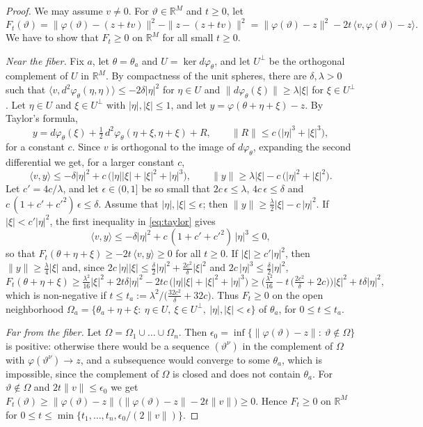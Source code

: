 \documentclass[11pt]{article}
\theoremstyle{definition}
\theoremstyle{remark}
\newcommand{\R}{\mathbb{R}}
\begin{document}
\begin{proof}
We may assume $v\ne0$. For $\vartheta\in\R^M$ and $t\ge0$, let
\[
F_t(\vartheta)=\|\varphi(\vartheta)-(z+tv)\|^2-\|z-(z+tv)\|^2=\|\varphi(\vartheta)-z\|^2-2t\,\langle v,\varphi(\vartheta)-z\rangle.
\]
We have to show that $F_t\ge0$ on $\R^M$ for all small $t\ge0$.

\emph{Near the fiber.} Fix $a$, let $\theta=\theta_a$ and $U=\ker d\varphi_\theta$, and let $U^\perp$ be the orthogonal complement of $U$ in $\R^M$. By compactness of the unit spheres, there are $\delta,\lambda>0$ such that $\langle v,d^2\varphi_\theta(\eta,\eta)\rangle\le-2\delta|\eta|^2$ for $\eta\in U$ and $\|d\varphi_\theta(\xi)\|\ge\lambda|\xi|$ for $\xi\in U^\perp$. Let $\eta\in U$ and $\xi\in U^\perp$ with $|\eta|,|\xi|\le1$, and let $y=\varphi(\theta+\eta+\xi)-z$. By Taylor's formula,
\[
y=d\varphi_\theta(\xi)+\tfrac12\,d^2\varphi_\theta(\eta+\xi,\eta+\xi)+R,\qquad\|R\|\le c\,\big(|\eta|^3+|\xi|^3\big),
\]
for a constant $c$. Since $v$ is orthogonal to the image of $d\varphi_\theta$, expanding the second differential we get, for a larger constant $c$,
\begin{equation}\label{eq:taylor}
\langle v,y\rangle\le-\delta|\eta|^2+c\,\big(|\eta||\xi|+|\xi|^2+|\eta|^3\big),\qquad\|y\|\ge\lambda|\xi|-c\,\big(|\eta|^2+|\xi|^2\big).
\end{equation}
Let $c'=4c/\lambda$, and let $\epsilon\in(0,1]$ be so small that $2c\,\epsilon\le\lambda$, $4c\,\epsilon\le\delta$ and $c\,(1+c'+c'^2)\,\epsilon\le\delta$. Assume that $|\eta|,|\xi|\le\epsilon$; then $\|y\|\ge\frac\lambda2|\xi|-c\,|\eta|^2$. If $|\xi|<c'|\eta|^2$, the first inequality in \eqref{eq:taylor} gives
\[
\langle v,y\rangle\le-\delta|\eta|^2+c\,(1+c'+c'^2)\,|\eta|^3\le0,
\]
so that $F_t(\theta+\eta+\xi)\ge-2t\,\langle v,y\rangle\ge0$ for all $t\ge0$. If $|\xi|\ge c'|\eta|^2$, then $\|y\|\ge\frac\lambda4|\xi|$ and, since $2c\,|\eta||\xi|\le\frac\delta2|\eta|^2+\frac{2c^2}\delta|\xi|^2$ and $2c\,|\eta|^3\le\frac\delta2|\eta|^2$,
\[
F_t(\theta+\eta+\xi)\ge\tfrac{\lambda^2}{16}|\xi|^2+2t\delta|\eta|^2-2tc\,\big(|\eta||\xi|+|\xi|^2+|\eta|^3\big)\ge\Big(\tfrac{\lambda^2}{16}-t\,\big(\tfrac{2c^2}\delta+2c\big)\Big)|\xi|^2+t\delta|\eta|^2,
\]
which is non-negative if $t\le t_a:=\lambda^2\big/\big(\tfrac{32c^2}\delta+32c\big)$. Thus $F_t\ge0$ on the open neighborhood $\Omega_a=\{\theta_a+\eta+\xi:\ \eta\in U,\ \xi\in U^\perp,\ |\eta|,|\xi|<\epsilon\}$ of $\theta_a$, for $0\le t\le t_a$.

\emph{Far from the fiber.} Let $\Omega=\Omega_1\cup\dots\cup\Omega_n$. Then $\epsilon_0=\inf\{\|\varphi(\vartheta)-z\|:\ \vartheta\notin\Omega\}$ is positive: otherwise there would be a sequence $(\vartheta^\nu)$ in the complement of $\Omega$ with $\varphi(\vartheta^\nu)\to z$, and a subsequence would converge to some $\theta_a$, which is impossible, since the complement of $\Omega$ is closed and does not contain $\theta_a$. For $\vartheta\notin\Omega$ and $2t\|v\|\le\epsilon_0$ we get $F_t(\vartheta)\ge\|\varphi(\vartheta)-z\|\,\big(\|\varphi(\vartheta)-z\|-2t\|v\|\big)\ge0$. Hence $F_t\ge0$ on $\R^M$ for $0\le t\le\min\{t_1,\dots,t_n,\epsilon_0/(2\|v\|)\}$.
\end{proof}
\end{document}
